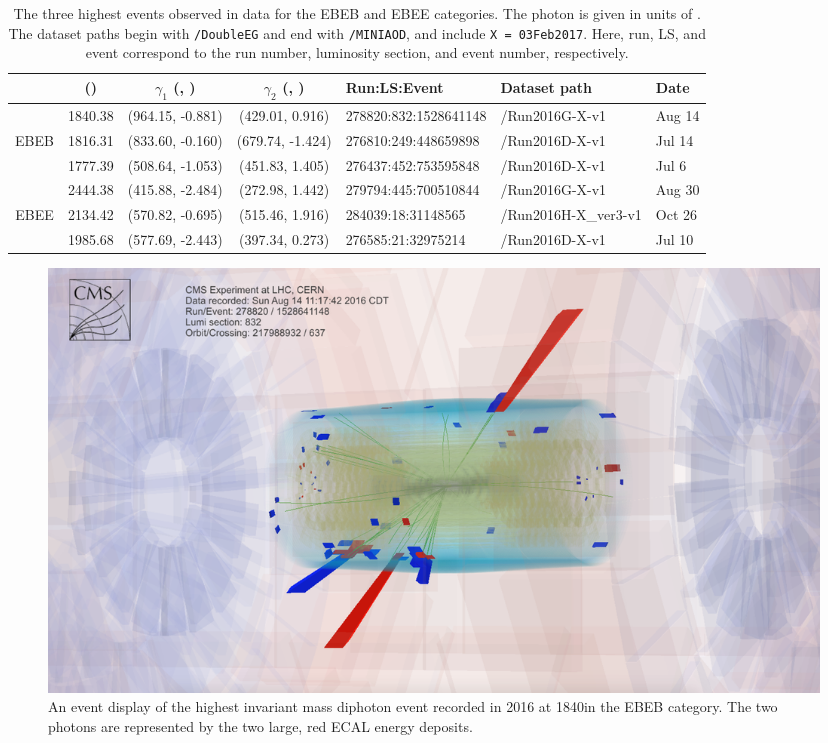 \begin{table}[!htbp]
	\scriptsize
	\caption{The three highest \mgg events observed in data for the EBEB and EBEE categories. The photon \pt is given in units of {\GeVns}. The dataset paths begin with \texttt{/DoubleEG} and end with \texttt{/MINIAOD}, and include \texttt{X = 03Feb2017}. Here, run, LS, and event correspond to the run number, luminosity section, and event number, respectively. }
	\label{tab:highest_mass_events}
	\centering
	\vspace{\baselineskip}
	\begin{tabular}{c|ccclll}
		\hline \hline
		\vspace*{+0.1mm} & \mgg ({\GeVns}) & $\gamma_1$ (\pt, \scEta) & $\gamma_2$ (\pt, \scEta) & Run:LS:Event & Dataset path & Date \\
		\hline
		     & 1840.38 & (964.15, -0.881) & (429.01, 0.916) & 278820:832:1528641148 & /Run2016G-X-v1 & Aug 14 \\
		EBEB & 1816.31 & (833.60, -0.160) & (679.74, -1.424) & 276810:249:448659898 & /Run2016D-X-v1 & Jul 14 \\
		     & 1777.39 & (508.64, -1.053) & (451.83, 1.405) & 276437:452:753595848 & /Run2016D-X-v1 & Jul 6 \\
		\hline
     		 & 2444.38 & (415.88, -2.484) & (272.98, 1.442) & 279794:445:700510844 & /Run2016G-X-v1 & Aug 30 \\
		EBEE & 2134.42 & (570.82, -0.695) & (515.46, 1.916) & 284039:18:31148565 & /Run2016H-X\_ver3-v1 & Oct 26 \\
		     & 1985.68 & (577.69, -2.443) & (397.34, 0.273) & 276585:21:32975214 & /Run2016D-X-v1 & Jul 10 \\
		\hline \hline
	\end{tabular}
\end{table}

\begin{figure}[!htb]
  \centering
  \includegraphics[width=0.99\textwidth]{figures/event_display_EBEB.png}
  \caption{An event display of the highest invariant mass diphoton event recorded in 2016 at 1840\GeV in the EBEB category. The two photons are represented by the two large, red ECAL energy deposits.}
  \label{fig:event_display}
\end{figure}

